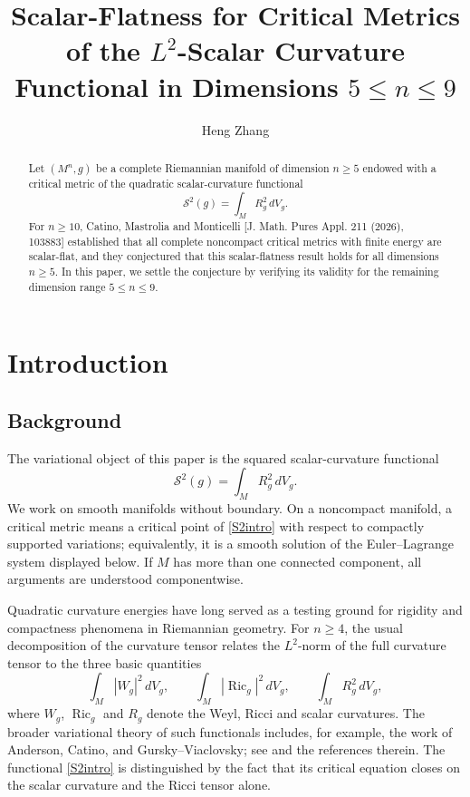 \documentclass[11pt]{amsart}
\title{Scalar-Flatness for Critical Metrics of the $L^2$-Scalar Curvature Functional in Dimensions $5\le n\le 9$}
\author{Heng Zhang}
\date{}
\numberwithin{equation}{section}
\DeclareMathOperator{\Ric}{Ric}
\begin{document}
\begin{abstract}
Let $(M^n,g)$ be a complete Riemannian manifold of dimension $n\geq 5$ endowed with a critical metric of the quadratic scalar-curvature functional
$$
\mathcal S^2(g)=\int_M R_g^2\,dV_g .
$$
For $n\geq 10$, Catino, Mastrolia and Monticelli [J. Math. Pures Appl. 211 (2026), 103883] established that all complete noncompact critical metrics with finite energy are scalar-flat, and they conjectured that this scalar-flatness result holds for all dimensions $n\geq 5$. In this paper, we settle the conjecture by verifying its validity for the remaining dimension range $5\leq n\leq 9$.
\end{abstract}

\maketitle
\section{Introduction}
\subsection{Background}
The variational object of this paper is the squared scalar-curvature functional
\begin{equation}\label{S2intro}
        \mathcal S^2(g)=\int_M R_g^2\,dV_g .
\end{equation}
We work on smooth manifolds without boundary.  On a noncompact manifold, a critical metric means a critical point of \eqref{S2intro} with respect to compactly supported variations; equivalently, it is a smooth solution of the Euler--Lagrange system displayed below.  If $M$ has more than one connected component, all arguments are understood componentwise.

Quadratic curvature energies have long served as a testing ground for rigidity and compactness phenomena in Riemannian geometry.  For $n\ge4$, the usual decomposition of the curvature tensor relates the $L^2$-norm of the full curvature tensor to the three basic quantities
$$
        \int_M |W_g|^2\,dV_g,
        \qquad
        \int_M |\Ric_g|^2\,dV_g,
        \qquad
        \int_M R_g^2\,dV_g,
$$
where $W_g$, $\Ric_g$ and $R_g$ denote the Weyl, Ricci and scalar curvatures.  The broader variational theory of such functionals includes, for example, the work of Anderson, Catino, and Gursky--Viaclovsky; see \cite{Anderson1997,Anderson2001,Catino2014,Catino2015,GurskyViaclovsky2015,GurskyViaclovsky2016} and the references therein.  The functional \eqref{S2intro} is distinguished by the fact that its critical equation closes on the scalar curvature and the Ricci tensor alone.
\end{document}
